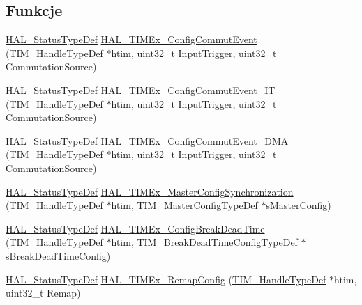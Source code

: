 \subsection*{Funkcje}
\begin{DoxyCompactItemize}
\item 
\hyperlink{stm32f4xx__hal__def_8h_a63c0679d1cb8b8c684fbb0632743478f}{H\+A\+L\+\_\+\+Status\+Type\+Def} \hyperlink{group___t_i_m_ex___exported___functions___group5_gab5802aa4b8b5a79b93b209b0277622ac}{H\+A\+L\+\_\+\+T\+I\+M\+Ex\+\_\+\+Config\+Commut\+Event} (\hyperlink{struct_t_i_m___handle_type_def}{T\+I\+M\+\_\+\+Handle\+Type\+Def} $\ast$htim, uint32\+\_\+t Input\+Trigger, uint32\+\_\+t Commutation\+Source)
\item 
\hyperlink{stm32f4xx__hal__def_8h_a63c0679d1cb8b8c684fbb0632743478f}{H\+A\+L\+\_\+\+Status\+Type\+Def} \hyperlink{group___t_i_m_ex___exported___functions___group5_gad9f5f717a203adafb70e66451b4f0472}{H\+A\+L\+\_\+\+T\+I\+M\+Ex\+\_\+\+Config\+Commut\+Event\+\_\+\+IT} (\hyperlink{struct_t_i_m___handle_type_def}{T\+I\+M\+\_\+\+Handle\+Type\+Def} $\ast$htim, uint32\+\_\+t Input\+Trigger, uint32\+\_\+t Commutation\+Source)
\item 
\hyperlink{stm32f4xx__hal__def_8h_a63c0679d1cb8b8c684fbb0632743478f}{H\+A\+L\+\_\+\+Status\+Type\+Def} \hyperlink{group___t_i_m_ex___exported___functions___group5_ga6ab2af489cfc5783e4ddd76a35edde31}{H\+A\+L\+\_\+\+T\+I\+M\+Ex\+\_\+\+Config\+Commut\+Event\+\_\+\+D\+MA} (\hyperlink{struct_t_i_m___handle_type_def}{T\+I\+M\+\_\+\+Handle\+Type\+Def} $\ast$htim, uint32\+\_\+t Input\+Trigger, uint32\+\_\+t Commutation\+Source)
\item 
\hyperlink{stm32f4xx__hal__def_8h_a63c0679d1cb8b8c684fbb0632743478f}{H\+A\+L\+\_\+\+Status\+Type\+Def} \hyperlink{group___t_i_m_ex___exported___functions___group5_ga056fd97d3be6c60dcfa12963f6ec8aad}{H\+A\+L\+\_\+\+T\+I\+M\+Ex\+\_\+\+Master\+Config\+Synchronization} (\hyperlink{struct_t_i_m___handle_type_def}{T\+I\+M\+\_\+\+Handle\+Type\+Def} $\ast$htim, \hyperlink{struct_t_i_m___master_config_type_def}{T\+I\+M\+\_\+\+Master\+Config\+Type\+Def} $\ast$s\+Master\+Config)
\item 
\hyperlink{stm32f4xx__hal__def_8h_a63c0679d1cb8b8c684fbb0632743478f}{H\+A\+L\+\_\+\+Status\+Type\+Def} \hyperlink{group___t_i_m_ex___exported___functions___group5_ga4414f3b3dcbed3f21ee3b06d6db9ffa4}{H\+A\+L\+\_\+\+T\+I\+M\+Ex\+\_\+\+Config\+Break\+Dead\+Time} (\hyperlink{struct_t_i_m___handle_type_def}{T\+I\+M\+\_\+\+Handle\+Type\+Def} $\ast$htim, \hyperlink{struct_t_i_m___break_dead_time_config_type_def}{T\+I\+M\+\_\+\+Break\+Dead\+Time\+Config\+Type\+Def} $\ast$s\+Break\+Dead\+Time\+Config)
\item 
\hyperlink{stm32f4xx__hal__def_8h_a63c0679d1cb8b8c684fbb0632743478f}{H\+A\+L\+\_\+\+Status\+Type\+Def} \hyperlink{group___t_i_m_ex___exported___functions___group5_ga683118282daf3aa2e319eb8eea93af31}{H\+A\+L\+\_\+\+T\+I\+M\+Ex\+\_\+\+Remap\+Config} (\hyperlink{struct_t_i_m___handle_type_def}{T\+I\+M\+\_\+\+Handle\+Type\+Def} $\ast$htim, uint32\+\_\+t Remap)
\end{DoxyCompactItemize}


